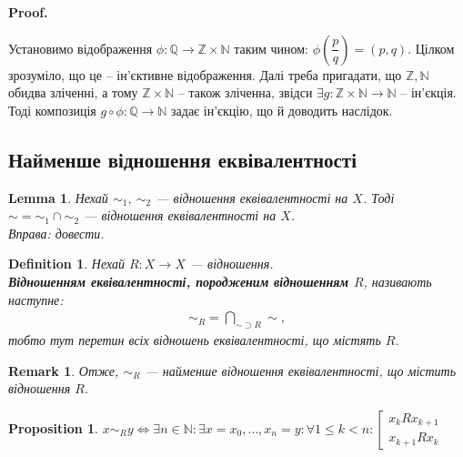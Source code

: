 \documentclass[a4paper, 14pt]{extarticle}
\makeatletter
\theoremstyle{theoremdd}
\theoremstyle{theoremdd}
\newtheorem{definition}[theorem]{Definition}
\theoremstyle{theoremdd}
\theoremstyle{theoremdd}
\theoremstyle{theoremdd}
\theoremstyle{theoremdd}
\theoremstyle{theoremdd}
\theoremstyle{theoremdd}
\theoremstyle{theoremdd}
\newtheorem{proposition}[theorem]{Proposition}
\theoremstyle{theoremdd}
\theoremstyle{theoremdd}
\newtheorem{remark}[theorem]{Remark}
\theoremstyle{theoremdd}
\theoremstyle{theoremdd}
\newtheorem{lemma}[theorem]{Lemma}
\theoremstyle{theoremdd}
\theoremstyle{theoremdd}
\renewenvironment{proof}[1][Proof.\\]{\par
\pushQED{\hfill \qed}%
\normalfont \topsep6\p@\@plus6\p@\relax
\trivlist
\item\relax
{\bfseries
#1\@addpunct{.}}\hspace\labelsep\ignorespaces
}{%
\popQED\endtrivlist\@endpefalse
}
\makeatother
\begin{document}
\begin{proof}
Установимо відображення $\phi \colon \mathbb{Q} \to \mathbb{Z} \times \mathbb{N}$ таким чином: $\phi\left( \dfrac{p}{q} \right) = (p,q)$. Цілком зрозуміло, що це -- ін'єктивне відображення. Далі треба пригадати, що $\mathbb{Z}, \mathbb{N}$ обидва зліченні, а тому $\mathbb{Z} \times \mathbb{N}$ -- також зліченна, звідси $\exists g \colon \mathbb{Z} \times \mathbb{N} \to \mathbb{N}$ -- ін'єкція. Тоді композиція $g \circ \phi \colon \mathbb{Q} \to \mathbb{N}$ задає ін'єкцію, що й доводить наслідок. 
\end{proof}

\subsection{Найменше відношення еквівалентності}
\begin{lemma}
Нехай $\sim_1,\ \sim_2$ --- відношення еквівалентності на $X$. Тоді $\sim = \sim_1 \cap \sim_2$ --- відношення еквівалентності на $X$.\\
\textit{Вправа: довести}.
\end{lemma}

\begin{definition}
Нехай $R \colon X \to X$ --- відношення.\\
\textbf{Відношенням еквівалентності, породженим відношенням $R$}, називають наступне:
\begin{align*}
\sim_R = \bigcap_{\sim \supset R} \sim,
\end{align*}
тобто тут перетин всіх відношень еквівалентності, що містять $R$.
\end{definition}

\begin{remark}
Отже, $\sim_R$ --- найменше відношення еквівалентності, що містить відношення $R$.
\end{remark}

\begin{proposition}
$x \sim_R y \iff \exists n \in \mathbb{N}: \exists x = x_0,\dots,x_n = y: \forall 1 \leq k < n: \left[ \begin{gathered} x_k R x_{k+1} \\ x_{k+1} R x_k \end{gathered} \right.$
\end{proposition}
\end{document}

